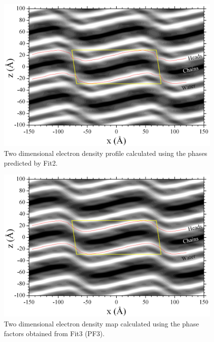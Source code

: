 \begin{landscape}
\begin{figure}[htbp]
  \centering
  \includegraphics[width=0.85\linewidth]{figures/ripple/LAXS/Fit2_2D_edp}
  \caption[Two dimensional electron density map calculated using the phase
  factors obtained from Fit2 (PF2).]
  {Two dimensional electron density profile calculated using the phases
  predicted by Fit2.}
  \label{fig:PF2_2D_edp}
\end{figure}
\end{landscape}

\begin{landscape}
\begin{figure}
  \centering
  \includegraphics[width=0.85\linewidth]{figures/ripple/LAXS/Fit3_2D_edp}
  \caption[]{Two dimensional electron density map calculated using the phase
  factors obtained from Fit3 (PF3).}
  \label{fig:PF3_2D_edp}
\end{figure}
\end{landscape}

